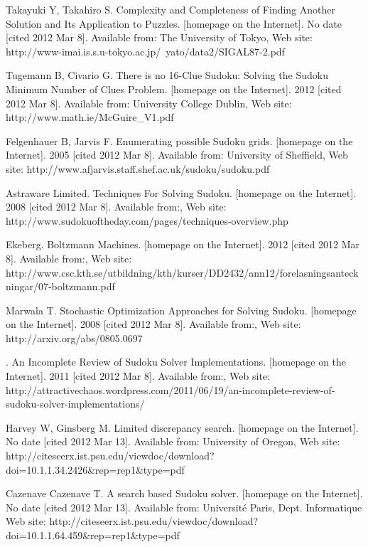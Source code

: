 \documentclass[a4paper,11pt]{kth-mag}
\begin{document}
\begin{thebibliography}{99}

Takayuki Y, Takahiro S. Complexity and Completeness of Finding Another Solution and Its Application to Puzzles. [homepage on the Internet]. No date [cited 2012 Mar 8]. Available from: The University of Tokyo, Web site: http://www-imai.is.s.u-tokyo.ac.jp/~yato/data2/SIGAL87-2.pdf

Tugemann B, Civario G. There is no 16-Clue Sudoku: Solving the Sudoku Minimum Number of Clues Problem. [homepage on the Internet]. 2012 [cited 2012 Mar 8]. Available from: University College Dublin, Web site: http://www.math.ie/McGuire\_V1.pdf

Felgenhauer B, Jarvis F. Enumerating possible Sudoku grids. [homepage on the Internet]. 2005 [cited 2012 Mar 8]. Available from: University of Sheffield, Web site: http://www.afjarvis.staff.shef.ac.uk/sudoku/sudoku.pdf

Astraware Limited. Techniques For Solving Sudoku. [homepage on the Internet]. 2008 [cited 2012 Mar 8]. Available from:, Web site: http://www.sudokuoftheday.com/pages/techniques-overview.php

Ekeberg. Boltzmann Machines. [homepage on the Internet]. 2012 [cited 2012 Mar 8]. Available from:, Web site: http://www.csc.kth.se/utbildning/kth/kurser/DD2432/ann12/forelasningsanteckningar/07-boltzmann.pdf

Marwala T. Stochastic Optimization Approaches for Solving Sudoku. [homepage on the Internet]. 2008 [cited 2012 Mar 8]. Available from:, Web site: http://arxiv.org/abs/0805.0697

. An Incomplete Review of Sudoku Solver Implementations. [homepage on the Internet]. 2011 [cited 2012 Mar 8]. Available from:, Web site: http://attractivechaos.wordpress.com/2011/06/19/an-incomplete-review-of-sudoku-solver-implementations/

Harvey W, Ginsberg M. Limited discrepancy search. [homepage on the Internet]. No date [cited 2012 Mar 13]. Available from: University of Oregon, Web site: http://citeseerx.ist.psu.edu/viewdoc/download?doi=10.1.1.34.2426\&rep=rep1\&type=pdf

Cazenave Cazenave T. A search based Sudoku solver. [homepage on the Internet]. No date [cited 2012 Mar 13]. Available from: Université Paris, Dept. Informatique Web site: http://citeseerx.ist.psu.edu/viewdoc/download?doi=10.1.1.64.459\&rep=rep1\&type=pdf


\end{thebibliography}
\end{document}
